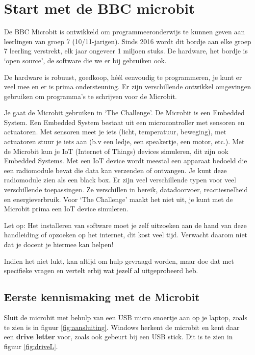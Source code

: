 
\section{Start met de BBC microbit}

De BBC Microbit is ontwikkeld om programmeeronderwijs te kunnen geven aan leerlingen van groep 7 (10/11-jarigen). Sinds 2016 wordt dit bordje aan elke groep 7 leerling verstrekt, elk jaar ongeveer 1 miljoen stuks. De hardware, het bordje is ‘open source’, de software die we er bij gebruiken ook.

De hardware is robuust, goedkoop, héél eenvoudig te programmeren, je kunt er veel mee en er is prima ondersteuning. Er zijn verschillende ontwikkel omgevingen gebruiken om programma’s te schrijven voor de Microbit. 

Je gaat de Microbit gebruiken in ‘The Challenge’. De Microbit is een Embedded System. Een Embedded System bestaat uit een microcontroller met sensoren en actuatoren. Met sensoren meet je iets (licht, temperatuur, beweging), met actuatoren stuur je iets aan (b.v een ledje, een speakertje, een motor, etc.). Met de Microbit kun je IoT (Internet of Things) devices simuleren, dit zijn ook Embedded Systems. Met een IoT device wordt meestal een apparaat bedoeld die een radiomodule bevat die data kan verzenden of ontvangen. Je kunt deze radiomodule zien als een black box. Er zijn veel verschillende typen voor veel verschillende toepassingen. Ze verschillen in bereik, datadoorvoer, reactiesnelheid en energieverbruik. 
Voor ‘The Challenge’ maakt het niet uit, je kunt met de Microbit prima een IoT device simuleren.

Let op: Het installeren van software moet je zelf uitzoeken aan de hand van  deze handleiding of opzoeken op het internet, dit kost veel tijd. Verwacht daarom niet dat je docent je hiermee kan helpen!

Indien het niet lukt, kan altijd om hulp gevraagd worden, maar doe dat met specifieke vragen en vertelt erbij wat jezelf al uitgeprobeerd heb.

\subsection{Eerste kennismaking met de Microbit}

Sluit de microbit met behulp van een USB micro snoertje aan op je laptop, zoals te zien is in figuur \ref{fig:aansluiting}.
Windows herkent de microbit en kent daar een \textbf{drive letter} voor, zoals ook gebeurt bij een USB stick. Dit is te zien in figuur \ref{fig:driveL}.


